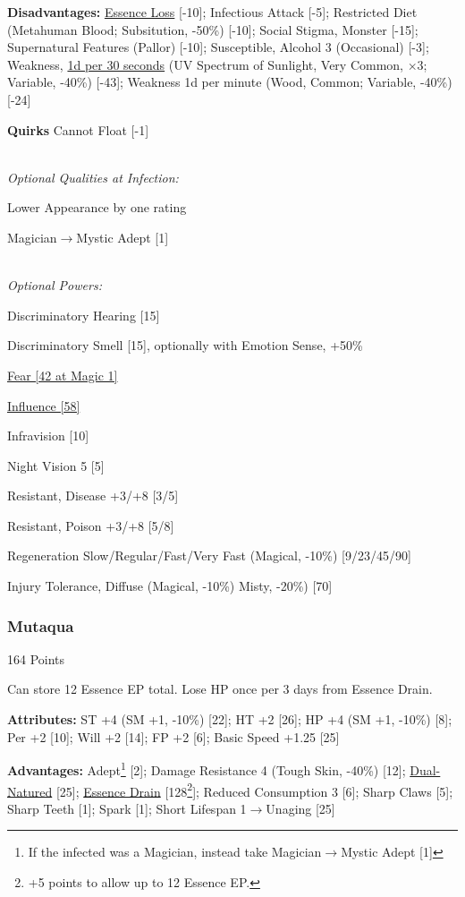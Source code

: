 \begin{multicols*}{3}
	\textbf{Disadvantages:}	
	\hyperref[essence_loss]{Essence Loss} [-10]; Infectious Attack [-5]; Restricted Diet (Metahuman Blood; Subsitution, -50\%) [-10]; Social Stigma, Monster [-15];  Supernatural Features (Pallor) [-10]; Susceptible, Alcohol 3 (Occasional) [-3]; Weakness, \textcolor{Blue}{\href{http://forums.sjgames.com/showpost.php?p=149688&postcount=7}{1d per 30 seconds}} (UV Spectrum of Sunlight, Very Common, $\times$3; Variable, -40\%) [-43]; Weakness 1d per minute (Wood, Common; Variable, -40\%) [-24]
	
	\textbf{Quirks} 
	Cannot Float [-1]
	
	\textit{\\Optional Qualities at Infection:}
	
	Lower Appearance by one rating	
	
	Magician$\rightarrow$Mystic Adept [1]
	
	\textit{\\Optional Powers:}
	
	Discriminatory Hearing [15]
	
	Discriminatory Smell [15], optionally with Emotion Sense, +50\%
	
	\hyperref[fear]{Fear [42 at Magic 1]}
	
	\hyperref[influence]{Influence [58]}
	
	Infravision [10]
	
	Night Vision 5 [5]
	
	Resistant, Disease +3/+8 [3/5]
	
	Resistant, Poison +3/+8 [5/8]
	
	Regeneration Slow/Regular/Fast/Very Fast (Magical, -10\%) [9/23/45/90]
	
	Injury Tolerance, Diffuse (Magical, -10\%) Misty, -20\%) [70]
	
	\subsubsection{Mutaqua}\label{mutaqua}
	\begin{flushright}
		164 Points
	\end{flushright}
	
	Can store 12 Essence EP total.
	Lose HP once per 3 days from Essence Drain.
		
	\textbf{Attributes:}
	ST +4 (SM +1, -10\%) [22]; HT +2 [26]; HP +4 (SM +1, -10\%) [8]; Per +2 [10]; Will +2 [14]; FP +2 [6]; Basic Speed +1.25 [25]
	
	\textbf{Advantages:}
	Adept\footnote{If the infected was a Magician, instead take Magician$\rightarrow$Mystic Adept [1]} [2]; Damage Resistance 4 (Tough Skin, -40\%) [12]; \hyperref[dual_natured]{Dual-Natured} [25];  \hyperref[essence_drain]{Essence Drain} [128\footnote{+5 points to allow up to 12 Essence EP.}]; Reduced Consumption 3 [6]; Sharp Claws [5]; Sharp Teeth [1]; Spark [1]; Short Lifespan 1$\rightarrow$Unaging [25]
	

\end{multicols*}
